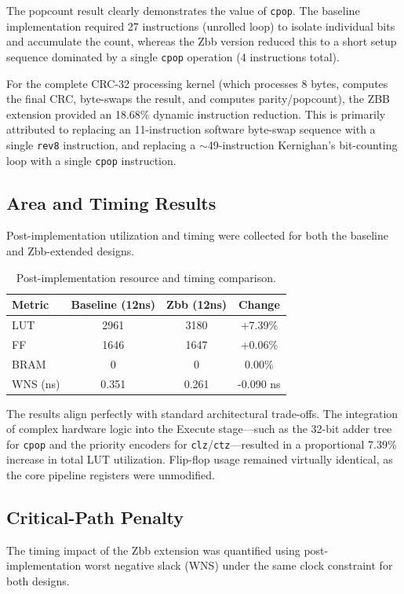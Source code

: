 \documentclass[conference]{IEEEtran}
\begin{document}
	The popcount result clearly demonstrates the value of \texttt{cpop}. The baseline implementation required 27 instructions (unrolled loop) to isolate individual bits and accumulate the count, whereas the Zbb version reduced this to a short setup sequence dominated by a single \texttt{cpop} operation (4 instructions total).
	
	For the complete CRC-32 processing kernel (which processes 8 bytes, computes the final CRC, byte-swaps the result, and computes parity/popcount), the ZBB extension provided an 18.68\% dynamic instruction reduction. This is primarily attributed to replacing an 11-instruction software byte-swap sequence with a single \texttt{rev8} instruction, and replacing a $\sim$49-instruction Kernighan's bit-counting loop with a single \texttt{cpop} instruction.
	
	\subsection{Area and Timing Results}
	Post-implementation utilization and timing were collected for both the baseline and Zbb-extended designs.
	
	\begin{table}[H]
		\centering
		\caption{Post-implementation resource and timing comparison.}
		\label{tab:area_timing}
		\begin{tabular}{lccc}
			\toprule
			\textbf{Metric} & \textbf{Baseline (12ns)} & \textbf{Zbb (12ns)} & \textbf{Change} \\
			\midrule
			LUT      & 2961  & 3180  & +7.39\% \\
			FF       & 1646  & 1647  & +0.06\% \\
			BRAM     & 0     & 0     & 0.00\% \\
			WNS (ns) & 0.351 & 0.261 & -0.090 ns \\
			\bottomrule
		\end{tabular}
	\end{table}
	
	The results align perfectly with standard architectural trade-offs. The integration of complex hardware logic into the Execute stage---such as the 32-bit adder tree for \texttt{cpop} and the priority encoders for \texttt{clz}/\texttt{ctz}---resulted in a proportional 7.39\% increase in total LUT utilization. Flip-flop usage remained virtually identical, as the core pipeline registers were unmodified.
	
	\subsection{Critical-Path Penalty}
	The timing impact of the Zbb extension was quantified using post-implementation worst negative slack (WNS) under the same clock constraint for both designs.
	
\end{document}
